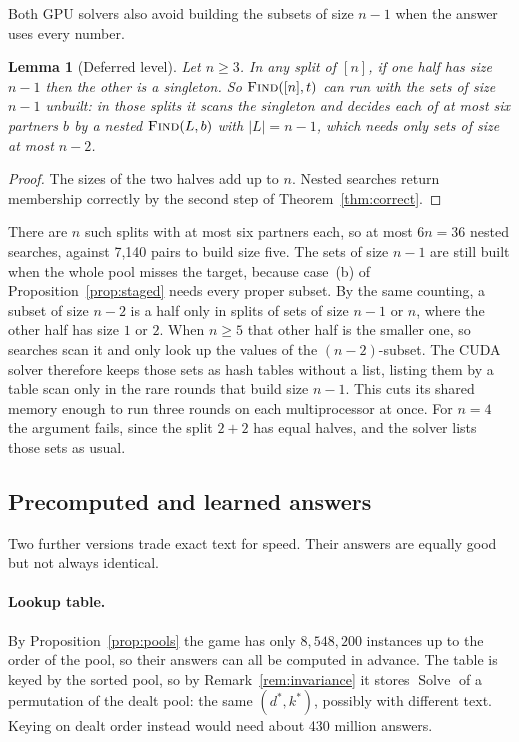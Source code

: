 \documentclass[11pt,a4paper]{article}
\newtheorem{lemma}[theorem]{Lemma}
\theoremstyle{definition}
\theoremstyle{remark}
\newcommand{\proc}[1]{\textnormal{\textsc{#1}}}
\begin{document}
Both GPU solvers also avoid building the subsets of size $n - 1$ when the answer uses every number.

\begin{lemma}[Deferred level]\label{lem:defer}
Let $n \ge 3$. In any split of $[n]$, if one half has size $n - 1$ then the other is a singleton. So
$\proc{Find}([n], t)$ can run with the sets of size $n - 1$ unbuilt: in those splits it scans the singleton
and decides each of at most six partners $b$ by a nested $\proc{Find}(L, b)$ with $|L| = n - 1$, which needs
only sets of size at most $n - 2$.
\end{lemma}

\begin{proof}
The sizes of the two halves add up to $n$. Nested searches return membership correctly by the second step of
Theorem~\ref{thm:correct}.
\end{proof}

There are $n$ such splits with at most six partners each, so at most $6n = 36$ nested searches, against
7{,}140 pairs to build size five. The sets of size $n - 1$ are still built when the whole pool misses the
target, because case~(b) of Proposition~\ref{prop:staged} needs every proper subset. By the same counting,
a subset of size $n - 2$ is a half only in splits of sets of size $n - 1$ or $n$, where the other half has size
$1$ or $2$. When $n \ge 5$ that other half is the smaller one, so searches scan it and only look up the
values of the $(n - 2)$-subset. The CUDA solver therefore keeps those sets as hash tables without a list,
listing them by a table scan only in the rare rounds that build size $n - 1$. This cuts its shared memory
enough to run three rounds on each multiprocessor at once. For $n = 4$ the argument fails, since the split
$2 + 2$ has equal halves, and the solver lists those sets as usual.

\subsection{Precomputed and learned answers}\label{sec:approx}

Two further versions trade exact text for speed. Their answers are equally good but not always identical.

\paragraph{Lookup table.}
By Proposition~\ref{prop:pools} the game has only $8{,}548{,}200$ instances up to the order of the pool, so
their answers can all be computed in advance. The table is keyed by the sorted pool, so by
Remark~\ref{rem:invariance} it stores $\operatorname{Solve}$ of a permutation of the dealt pool: the same
$(d^*, k^*)$, possibly with different text. Keying on dealt order instead would need about 430 million
answers.
\end{document}

